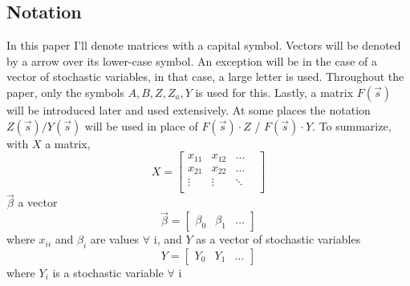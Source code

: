\subsection*{Notation} 
In this paper I'll denote matrices with a capital symbol. Vectors will be denoted by a arrow over its lower-case symbol. An exception will be in the case of a vector of stochastic variables, in that case, a large letter is used. Throughout the paper, only the symbols $A, B, Z, Z_a, Y$ is used for this. 
Lastly, a matrix $F(\vec{s})$ will be introduced later and used extensively. At some places the notation $Z(\vec{s}) / Y(\vec{s})$ will be used in place of $F(\vec{s}) \cdot Z$ / $F(\vec{s}) \cdot Y$.
To summarize, with $X$ a matrix,
\begin{equation*}
    X = 
    \begin{bmatrix}
    x_{11} & x_{12} & \dots & \\
    x_{21} & x_{22} & \dots & \\
    \vdots & \vdots & \ddots & \\
    & & & 
    \end{bmatrix}
\end{equation*}
$\vec{\beta}$ a vector
\begin{equation*}
    \vec{\beta} = \begin{bmatrix} \beta_0 & \beta_1 & \dots \end{bmatrix}
\end{equation*}
where $x_{ii}$ and $\beta_i$ are values $\forall$ i, and $Y$ as a vector of stochastic variables
\begin{equation*}
    Y = \begin{bmatrix} Y_0 & Y_1 & \dots \end{bmatrix}
\end{equation*}
where $Y_i$ is a stochastic variable $\forall$ i
